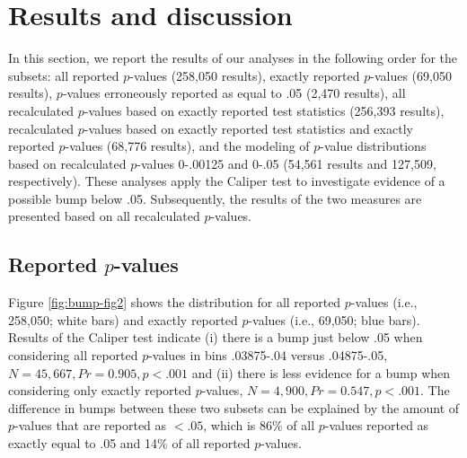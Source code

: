 \documentclass[a5paper]{book}
\begin{document}
\section{Results and discussion}\label{results-and-discussion}

In this section, we report the results of our analyses in the following
order for the subsets: all reported \(p\)-values (258,050 results),
exactly reported \(p\)-values (69,050 results), \(p\)-values erroneously
reported as equal to .05 (2,470 results), all recalculated \(p\)-values
based on exactly reported test statistics (256,393 results),
recalculated \(p\)-values based on exactly reported test statistics and
exactly reported \(p\)-values (68,776 results), and the modeling of
\(p\)-value distributions based on recalculated \(p\)-values 0-.00125
and 0-.05 (54,561 results and 127,509, respectively). These analyses
apply the Caliper test to investigate evidence of a possible bump below
.05. Subsequently, the results of the two measures are presented based
on all recalculated \(p\)-values.

\subsection{\texorpdfstring{Reported
\(p\)-values}{Reported p-values}}\label{reported-p-values}

Figure \ref{fig:bump-fig2} shows the distribution for all reported
\(p\)-values (i.e., 258,050; white bars) and exactly reported
\(p\)-values (i.e., 69,050; blue bars). Results of the Caliper test
indicate (i) there is a bump just below .05 when considering all
reported \(p\)-values in bins .03875-.04 versus .04875-.05,
\(N=45,667, Pr=0.905,p<.001\) and (ii) there is less evidence for a bump
when considering only exactly reported \(p\)-values,
\(N=4,900,Pr=0.547,p<.001\). The difference in bumps between these two
subsets can be explained by the amount of \(p\)-values that are reported
as \(<.05\), which is 86\% of all \(p\)-values reported as exactly equal
to .05 and 14\% of all reported \(p\)-values.
\end{document}
